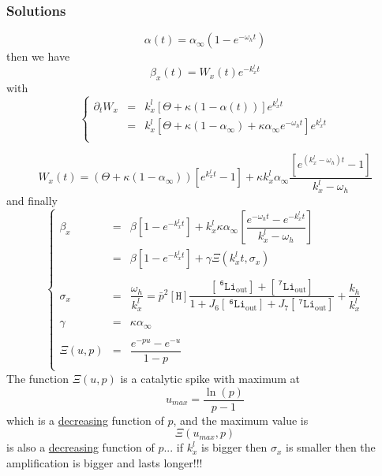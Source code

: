 \documentclass[aps,onecolumn,12pt]{revtex4}
\newcommand{\mychem}[1]{\mathtt{#1}}
\newcommand{\myconc}[1]{\left\lbrack{#1}\right\rbrack}
\newcommand{\spLi}[1]{{~^{\mychem{#1}}\mychem{Li}}}
\newcommand{\spLiOut}[1]{{\spLi{#1}}_{\mathrm{out}}}
\newcommand{\LiOut}[1]{\myconc{\spLiOut{#1}}}
\newcommand{\spproton}{\mychem{H}}
\newcommand{\proton}{\myconc{\spproton}}
\begin{document}
\subsubsection{Solutions}

\begin{equation}
	\alpha(t) = \alpha_\infty \left(1-e^{-\omega_ht}\right)
\end{equation}
then we have
\begin{equation}
	\beta_x(t) = W_x(t) e^{-k_x^l t }
\end{equation}
with
\begin{equation}
\left \lbrace
\begin{array}{rcl}
	\partial_tW_x & = & k_x^l \left[ \Theta + \kappa(1-\alpha(t)) \right] e^{k_x^lt} \\
	& = & k_x^l \left[ \Theta + \kappa(1-\alpha_\infty) + \kappa\alpha_\infty e^{-\omega_h t} \right] e^{k_x^lt} \\
\end{array}
\right.
\end{equation}
	
\begin{equation}
		W_x(t) = \left(\Theta+\kappa(1-\alpha_\infty)\right) \left[e^{k_x^l t}-1\right]
		+ \kappa k_x^l \alpha_\infty \dfrac{\left[e^{\left(k_x^l-\omega_h\right) t}-1\right]}{k_x^l-\omega_h}
\end{equation}	
and finally
\begin{equation}
\left\lbrace
\begin{array}{rcl}
	\beta_x & = & \beta \left[1-e^{-k_x^l t}\right] 
	+ k_x^l \kappa \alpha_\infty
	\left[
	 \dfrac{
	 e^{-\omega_h t} - e^{-k_x^l t}
	 }
	 {k_x^l-\omega_h}
	 \right]\\
	 & = & \beta \left[1-e^{-k_x^l t}\right] + \gamma \Xi\left(k_x^lt,\sigma_x\right)\\
	 \\
	 \sigma_x & = & \dfrac{\omega_h}{k_x^l} = \bar{p}^2\proton \dfrac{\LiOut{6}+\LiOut{7}}{1+J_6\LiOut{6}+J_7\LiOut{7}} + \dfrac{k_h}{k_x^l} \\
	 \\
	 \gamma & = & \kappa \alpha_\infty \\
	 \\
	 \Xi\left(u,p\right) & = & \dfrac{e^{-pu}-e^{-u}}{1-p}\\
\end{array}
\right.
\end{equation}
The function $\Xi\left(u,p\right)$ is a catalytic spike with maximum at 
\begin{equation}
	u_{max} = \dfrac{\ln(p)}{p-1}
\end{equation}
which is a \underline{decreasing} function of $p$, and the maximum value is
\begin{equation}
	\Xi\left(u_{max},p\right)
\end{equation}
is also a \underline{decreasing} function of $p$...
if $k_x^l$ is bigger then $\sigma_x$ is smaller then the amplification is bigger and lasts longer!!!
\end{document}

